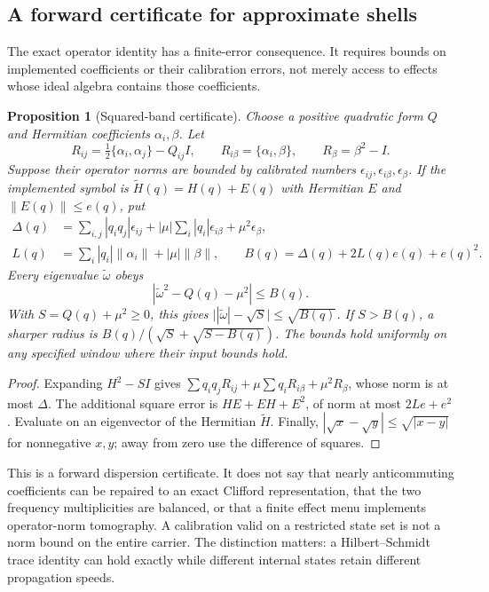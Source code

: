 \documentclass[12pt]{article}
\newtheorem{proposition}[theorem]{Proposition}
\theoremstyle{definition}
\theoremstyle{remark}
\begin{document}
\subsection{A forward certificate for approximate shells}
\label{sec:residual}

The exact operator identity has a finite-error consequence. It requires bounds on implemented coefficients or their calibration errors, not merely access to effects whose ideal algebra contains those coefficients.

\begin{proposition}[Squared-band certificate]\label{prop:residual}
Choose a positive quadratic form $Q$ and Hermitian coefficients $\alpha_i,\beta$. Let
\[
 R_{ij}=\tfrac12\{\alpha_i,\alpha_j\}-Q_{ij}I,\qquad
 R_{i\beta}=\{\alpha_i,\beta\},\qquad R_\beta=\beta^2-I .
\]
Suppose their operator norms are bounded by calibrated numbers
$\epsilon_{ij},\epsilon_{i\beta},\epsilon_\beta$. If the implemented symbol is
$\widetilde H(q)=H(q)+E(q)$ with Hermitian $E$ and
$\|E(q)\|\le e(q)$, put
\begin{align*}
 \Delta(q)&=\sum_{i,j}|q_iq_j|\epsilon_{ij}
  +|\mu|\sum_i|q_i|\epsilon_{i\beta}+\mu^2\epsilon_\beta,\\
 L(q)&=\sum_i|q_i|\|\alpha_i\|+|\mu|\|\beta\|,\qquad
 B(q)=\Delta(q)+2L(q)e(q)+e(q)^2 .
\end{align*}
Every eigenvalue $\widetilde\omega$ obeys
\[
 \left|\widetilde\omega^2-Q(q)-\mu^2\right|\le B(q).
\]
With $S=Q(q)+\mu^2\ge0$, this gives
$\bigl||\widetilde\omega|-\sqrt S\bigr|\le\sqrt{B(q)}$.
If $S>B(q)$, a sharper radius is
$B(q)/(\sqrt S+\sqrt{S-B(q)})$.
The bounds hold uniformly on any specified window where their input bounds hold.
\end{proposition}
\begin{proof}
Expanding $H^2-SI$ gives $\sum q_iq_jR_{ij}+\mu\sum q_iR_{i\beta}+\mu^2R_\beta$, whose norm is at most $\Delta$. The additional square error is $HE+EH+E^2$, of norm at most $2Le+e^2$. Evaluate on an eigenvector of the Hermitian $\widetilde H$. Finally, $|\sqrt x-\sqrt y|\le\sqrt{|x-y|}$ for nonnegative $x,y$; away from zero use the difference of squares.
\end{proof}

This is a forward dispersion certificate. It does not say that nearly anticommuting coefficients can be repaired to an exact Clifford representation, that the two frequency multiplicities are balanced, or that a finite effect menu implements operator-norm tomography. A calibration valid on a restricted state set is not a norm bound on the entire carrier. The distinction matters: a Hilbert--Schmidt trace identity can hold exactly while different internal states retain different propagation speeds.
\end{document}
